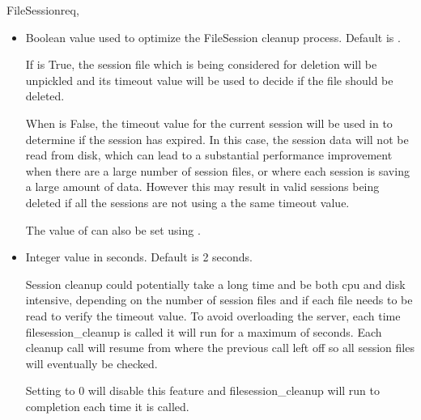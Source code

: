 \begin{classdesc}{FileSession}{req, }
\begin{itemize}
    The timeout used in the fast_cleanup calculation is same as the
    timeout for the session in the current request running the
    filesession_cleanup. If your session objects are not using the same
    timeout, or you are manually setting the timeout for a particular
    session with , you will need to set 
     = True.

    The value of  can also be set using
    .
    
  \item
    Boolean value used to optimize the FileSession cleanup process.
    Default is .
    
    If  is True, the session file which is being 
    considered for deletion will be unpickled and its timeout value
    will be used to decide if the file should be deleted. 
    
    When  is False, the timeout value for the current
    session will be used in to determine if the session has expired. In
    this case, the session data will not be read from disk, which can
    lead to a substantial performance improvement when there are a large
    number of session files, or where each session is saving a large 
    amount of data. However this may result in valid sessions being
    deleted if all the sessions are not using a the same timeout value.
    
    The value of  can also be set using
    .
    
  \item
    Integer value in seconds. Default is 2 seconds.

    Session cleanup could potentially take a long time and be both cpu
    and disk intensive, depending on the number of session files and if
    each file needs to be read to verify the timeout value. To avoid
    overloading the server, each time filesession_cleanup is called it
    will run for a maximum of  seconds.
    Each cleanup call will resume from where the previous call left off
    so all session files will eventually be checked.

    Setting  to 0 will disable this 
    feature and filesession_cleanup will run to completion each time it
    is called.


\end{itemize}
\end{classdesc}
